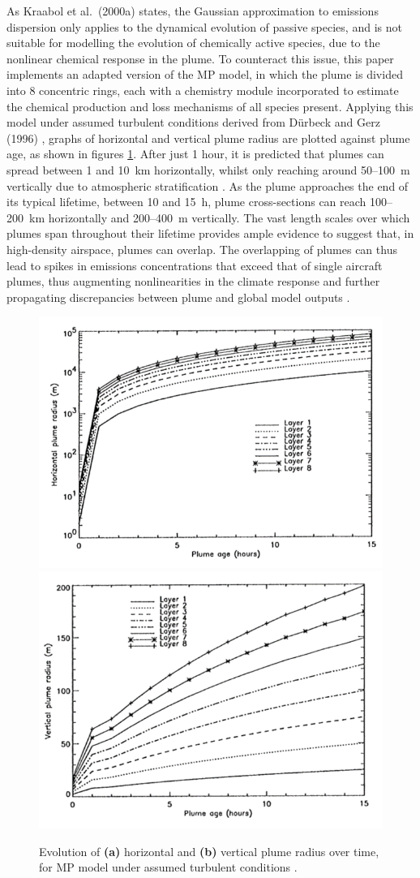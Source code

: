 As Kraabol et al.\ (2000a) \cite{Kraabol2000a} states, the Gaussian approximation to emissions dispersion only applies to the dynamical evolution of passive species, and is not suitable for modelling the evolution of chemically active species, due to the nonlinear chemical response in the plume. To counteract this issue, this paper implements an adapted version of the MP model, in which the plume is divided into 8 concentric rings, each with a chemistry module incorporated to estimate the chemical production and loss mechanisms of all species present. Applying this model under assumed turbulent conditions derived from D{\"u}rbeck and Gerz (1996) \cite{Durbeck1996}, graphs of horizontal and vertical plume radius are plotted against plume age, as shown in figures \ref{Kraabol}. After just 1 hour, it is predicted that plumes can spread between 1 and 10~km horizontally, whilst only reaching around 50--100~m vertically due to atmospheric stratification \cite{Durbeck1995}. As the plume approaches the end of its typical lifetime, between 10 and 15~h, plume cross-sections can reach 100--200~km horizontally and 200--400~m vertically. The vast length scales over which plumes span throughout their lifetime provides ample evidence to suggest that, in high-density airspace, plumes can overlap. The overlapping of plumes can thus lead to spikes in emissions concentrations that exceed that of single aircraft plumes, thus augmenting nonlinearities in the climate response and further propagating discrepancies between plume and global model outputs \cite{Schlager1997}. 


\begin{figure}[H]
	\centering
	\subfloat
		{
\centering
		\includegraphics[width=.36\textwidth]{Kraabol1.png}
		}
	\subfloat
		{
\centering
		\includegraphics[width=.36\textwidth]{Kraabol2.png}
		}
	\caption{Evolution of \textbf{(a)} horizontal and \textbf{(b)} vertical plume radius over time, for MP model under assumed turbulent conditions \cite{Kraabol2000}.}
	\label{Kraabol}
\end{figure}

